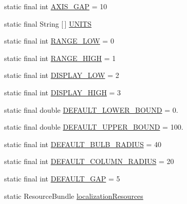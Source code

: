 \begin{DoxyCompactItemize}
static final int \mbox{\hyperlink{classorg_1_1jfree_1_1chart_1_1plot_1_1_thermometer_plot_a6a4dae5668071c8d00e60bdf9ca4d8ad}{A\+X\+I\+S\+\_\+\+G\+AP}} = 10
\item 
static final String \mbox{[}$\,$\mbox{]} \mbox{\hyperlink{classorg_1_1jfree_1_1chart_1_1plot_1_1_thermometer_plot_a82743e3e6808da1984086f3a284ce298}{U\+N\+I\+TS}}
\item 
static final int \mbox{\hyperlink{classorg_1_1jfree_1_1chart_1_1plot_1_1_thermometer_plot_a38b299921830c78a17f8bbb4fe83c161}{R\+A\+N\+G\+E\+\_\+\+L\+OW}} = 0
\item 
static final int \mbox{\hyperlink{classorg_1_1jfree_1_1chart_1_1plot_1_1_thermometer_plot_a9eb9c1bde8edfe80bc45946ed767ba27}{R\+A\+N\+G\+E\+\_\+\+H\+I\+GH}} = 1
\item 
static final int \mbox{\hyperlink{classorg_1_1jfree_1_1chart_1_1plot_1_1_thermometer_plot_a86e9dfdce3154dd5ab94712fa9ec1b7b}{D\+I\+S\+P\+L\+A\+Y\+\_\+\+L\+OW}} = 2
\item 
static final int \mbox{\hyperlink{classorg_1_1jfree_1_1chart_1_1plot_1_1_thermometer_plot_ad660ce4f518af336d70ee7c9fc57f8f5}{D\+I\+S\+P\+L\+A\+Y\+\_\+\+H\+I\+GH}} = 3
\item 
static final double \mbox{\hyperlink{classorg_1_1jfree_1_1chart_1_1plot_1_1_thermometer_plot_ab48acc6c44548a0959e5f474098949b7}{D\+E\+F\+A\+U\+L\+T\+\_\+\+L\+O\+W\+E\+R\+\_\+\+B\+O\+U\+ND}} = 0.
\item 
static final double \mbox{\hyperlink{classorg_1_1jfree_1_1chart_1_1plot_1_1_thermometer_plot_a9c1aa76235ed7153847357880aeaf052}{D\+E\+F\+A\+U\+L\+T\+\_\+\+U\+P\+P\+E\+R\+\_\+\+B\+O\+U\+ND}} = 100.
\item 
static final int \mbox{\hyperlink{classorg_1_1jfree_1_1chart_1_1plot_1_1_thermometer_plot_af53e62e595f6a7272fa1f766f7f03523}{D\+E\+F\+A\+U\+L\+T\+\_\+\+B\+U\+L\+B\+\_\+\+R\+A\+D\+I\+US}} = 40
\item 
static final int \mbox{\hyperlink{classorg_1_1jfree_1_1chart_1_1plot_1_1_thermometer_plot_ae4b0afa9ca9d30332f6aab346f9b2558}{D\+E\+F\+A\+U\+L\+T\+\_\+\+C\+O\+L\+U\+M\+N\+\_\+\+R\+A\+D\+I\+US}} = 20
\item 
static final int \mbox{\hyperlink{classorg_1_1jfree_1_1chart_1_1plot_1_1_thermometer_plot_ae38c100e7c7e4e7f6e116d206240fda9}{D\+E\+F\+A\+U\+L\+T\+\_\+\+G\+AP}} = 5
\item 
static Resource\+Bundle \mbox{\hyperlink{classorg_1_1jfree_1_1chart_1_1plot_1_1_thermometer_plot_a7e1a0ce491ac900397d27c5f623f6fc6}{localization\+Resources}}
\end{DoxyCompactItemize}
